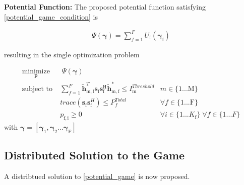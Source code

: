 \documentclass[12pt,a4paper]{report}
\begin{document}
\textbf{Potential Function:} The proposed potential function satisfying \eqref{potential_game_condition} is 

\begin{gather*} \label{Potential_Function}
\Psi(\mathbf{\gamma}) = \sum_{f = 1}^{F} U_{\text{f}}(\mathbf{\gamma_{\mathrm{f}}}) 
\end{gather*}

resulting in the single optimization problem 
	
		\begin{subequations}
	\label{optim}
	\begin{align}
	    \underset{\mathbf{p}}{\text{minimize}}
	    & \; \Psi(\mathbf{\gamma}) \label{potential_game} \\
	    \text{subject to} \; &
	  \sum^F_{f=1} \mathbf{\tilde{h}}_{\mathrm{m,f}}^T  \mathbf{s}_{\mathrm{f}} 						
	\mathbf{s_{\mathrm{f}}^{\mathrm{H}}} \mathbf{\tilde{h}_{\mathrm{m,f}}^*} \leq I^{Threshold}		
	_{\mathrm{m}} & m \in \{1 ...\text{M}\} 
		\label{interference_const}\\
        & trace(\mathbf{s}_\mathrm{f}\mathbf{s}_\mathrm{f}^H)  \leq P^{Total}_{f}  \label{power_const}
        & \forall f \in \{1 ... \text{F}\}\\
        & p_{\mathrm{f,i}} \geq 0 &  \forall i \in \{1 ...K_{\mathrm{f}}\} \; \forall f \in \{1 ... F\}\label{pos_power_const}
	\end{align}
	\end{subequations}
	with $\mathbf{\gamma}= [\mathbf{\gamma_{\mathrm{1}}},\mathbf{\gamma_{\mathrm{2}}}...\mathbf{\gamma_{\mathrm{F}}}]$


\subsection{Distributed Solution to the Game}
A distribtued solution to \eqref{potential_game} is now proposed.
\end{document}
